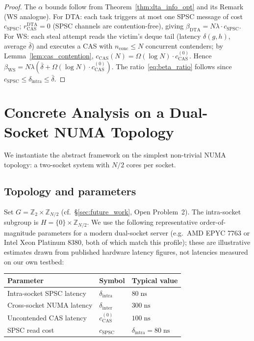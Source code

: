 \documentclass[11pt,a4paper]{report}
\begin{document}
\begin{proof}
The $\alpha$ bounds follow from Theorem~\ref{thm:dta_info_opt} and its
Remark (WS analogue).
For DTA: each task triggers at most one SPSC message of cost $c_{\mathrm{SPSC}}$;
$r_{\mathrm{CAS}}^\mathrm{DTA} = 0$ (SPSC channels are contention-free), giving
$\beta_{\mathrm{DTA}} = N\lambda \cdot c_{\mathrm{SPSC}}$.
For WS: each steal attempt reads the victim's deque tail (latency $\delta(g,h)$,
average $\bar\delta$) and executes a CAS with $n_{\mathrm{conc}} \leq N$
concurrent contenders; by Lemma~\ref{lem:cas_contention},
$c_{\mathrm{CAS}}(N) = \Omega(\log N)\cdot c_{\mathrm{CAS}}^{(0)}$.
Hence $\beta_{\mathrm{WS}} = N\lambda(\bar\delta + \Omega(\log N)\cdot c_{\mathrm{CAS}}^{(0)})$.
The ratio~\eqref{eq:beta_ratio} follows since $c_{\mathrm{SPSC}} \leq \delta_{\mathrm{intra}} \leq \bar\delta$.
\end{proof}

\section{Concrete Analysis on a Dual-Socket NUMA Topology}
\label{sec:numa_concrete}

We instantiate the abstract framework on the simplest non-trivial NUMA
topology: a two-socket system with $N/2$ cores per socket.

\subsection{Topology and parameters}

Set $G = \mathbb{Z}_2 \times \mathbb{Z}_{N/2}$ (cf.~\S\ref{sec:future_work},
Open Problem~2).  The intra-socket subgroup is
$H = \{0\} \times \mathbb{Z}_{N/2}$.  We use the following representative
order-of-magnitude parameters for a modern dual-socket server (e.g.\
AMD EPYC 7763 or Intel Xeon Platinum 8380, both of which match this
profile); these are illustrative estimates drawn from published
hardware latency figures, not latencies measured on our own testbed:
\begin{center}
\begin{tabular}{lll}
\toprule
Parameter & Symbol & Typical value \\
\midrule
Intra-socket SPSC latency & $\delta_{\mathrm{intra}}$ & $80\;\mathrm{ns}$ \\
Cross-socket NUMA latency & $\delta_{\mathrm{inter}}$ & $300\;\mathrm{ns}$ \\
Uncontended CAS latency   & $c_{\mathrm{CAS}}^{(0)}$ & $100\;\mathrm{ns}$ \\
SPSC read cost            & $c_{\mathrm{SPSC}}$       & $\delta_{\mathrm{intra}} = 80\;\mathrm{ns}$ \\
\bottomrule
\end{tabular}
\end{center}
\end{document}
